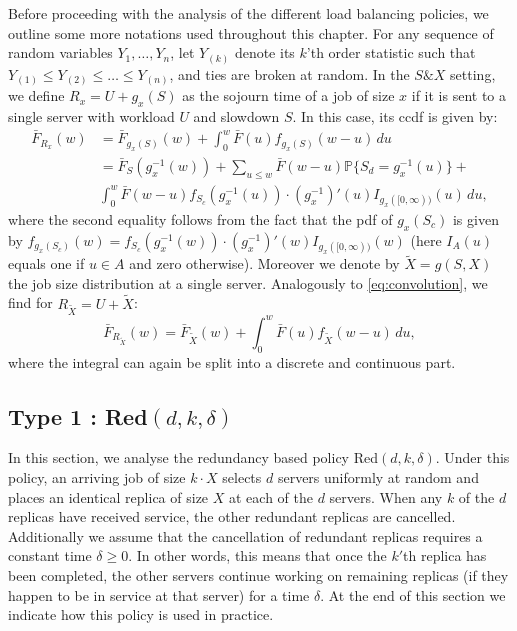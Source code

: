 \documentclass[12pt]{report}
\renewcommand{\P}{\mathbb{P}}
\renewcommand{\P}{\mathbb{P}}
\begin{document}
Before proceeding with the analysis of the different load balancing policies, we outline some more notations used throughout this chapter. For any sequence of random variables $Y_1,\dots, Y_n$, let $Y_{(k)}$ denote its $k$'th order statistic such that $Y_{(1)} \leq Y_{(2)} \leq \dots \leq Y_{(n)}$, and ties are broken at random.
In the $S\&X$ setting, we define $R_x = U+g_x(S)$ as the sojourn time of a job of size $x$ if it is sent to a single server
with workload $U$ and slowdown $S$. In this case, its ccdf is given by:
\begin{align}
\bar F_{R_x}(w)
&= \bar F_{g_x(S)}(w) + \int_0^w \bar F(u) f_{g_x(S)}(w-u)\, du\nonumber \\
&= \bar F_S(g_x^{-1}(w)) + \sum_{u\leq w} \bar F(w-u) \P\{S_d=g_x^{-1}(u)\}\nonumber+\\
&\int_0^w \bar F(w-u) f_{S_c}(g_x^{-1}(u)) \cdot (g_x^{-1})'(u) I_{g_x([0,\infty))}(u)\, du, \label{eq:convolution}
\end{align}
where the second equality follows from the fact that the pdf of $g_x(S_c)$ is given by $f_{g_x(S_c)}(w)=f_{S_c}(g_x^{-1}(w)) \cdot (g_x^{-1})'(w) I_{g_x([0,\infty))}(w)$ (here $I_A(u)$ equals one if $u \in A$ and zero otherwise).
Moreover we denote by $\tilde{X}=g(S,X)$ the job size distribution at a single server. Analogously to \eqref{eq:convolution}, we find for $R_{\tilde X} = U+\tilde{X}$:
\begin{equation}
\bar F_{R_{\tilde X}}(w)
=
\bar F_{\tilde{X}}(w) + \int_0^w \bar F(u) f_{\tilde{X}}(w-u)\, du,
\label{eq:convolution_tilde}
\end{equation}
where the integral can again be split into a discrete and continuous part.

\subsection{Type 1 : Red$(d,k,\delta)$}
In this section, we analyse the redundancy based policy Red$(d,k,\delta)$. Under this policy, an arriving job of size $k\cdot X$ selects $d$ servers uniformly at random and places an identical replica of size $X$ at each of the $d$ servers. When any $k$ of the $d$ replicas have received service, the  other redundant replicas are cancelled. Additionally we assume that the cancellation of redundant replicas requires a constant time $\delta\geq 0$. In other words, this means that once the $k'$th replica has been completed, the other servers continue working on remaining replicas (if they happen to be in service at that server) for a time $\delta$. At the end of this section we indicate how this policy is used in practice.
\end{document}
